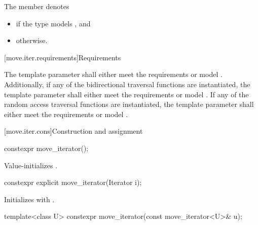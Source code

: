 \pnum
The member   denotes
\begin{itemize}
\item
{} if
the type
 models
, and
\item
{} otherwise.
\end{itemize}

[move.iter.requirements]{Requirements}

\pnum
The template parameter  shall either
meet the  requirements
or model .
Additionally, if any of the bidirectional traversal
functions are instantiated, the template parameter shall either
meet the  requirements
or model .
If any of the random access traversal functions are instantiated, the
template parameter shall either
meet the  requirements
or model
.

[move.iter.cons]{Construction and assignment}

%
\begin{itemdecl}
constexpr move_iterator();
\end{itemdecl}

\begin{itemdescr}
\pnum
\effects
Value-initializes .
\end{itemdescr}


%
\begin{itemdecl}
constexpr explicit move_iterator(Iterator i);
\end{itemdecl}

\begin{itemdescr}
\pnum
\effects
Initializes  with .
\end{itemdescr}


%
\begin{itemdecl}
template<class U> constexpr move_iterator(const move_iterator<U>& u);
\end{itemdecl}

